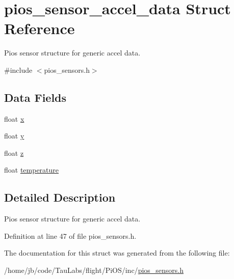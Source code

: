 \hypertarget{structpios__sensor__accel__data}{\section{pios\-\_\-sensor\-\_\-accel\-\_\-data \-Struct \-Reference}
\label{structpios__sensor__accel__data}
}


\-Pios sensor structure for generic accel data.  




{\ttfamily \#include $<$pios\-\_\-sensors.\-h$>$}

\subsection*{\-Data \-Fields}
\begin{DoxyCompactItemize}
\item 
float \hyperlink{group___p_i_o_s___s_e_n_s_o_r_s_gae32485cbb3023e21caf5ac1fd8378fb3}{x}
\item 
float \hyperlink{group___p_i_o_s___s_e_n_s_o_r_s_ga9f94596a8b62bafbbbd58e9196347e82}{y}
\item 
float \hyperlink{group___p_i_o_s___s_e_n_s_o_r_s_ga8d801598e8a0f5aade459361b3ec9b7a}{z}
\item 
float \hyperlink{group___p_i_o_s___s_e_n_s_o_r_s_gadb57b0d1050bd04870c0ad76832f4287}{temperature}
\end{DoxyCompactItemize}


\subsection{\-Detailed \-Description}
\-Pios sensor structure for generic accel data. 

\-Definition at line 47 of file pios\-\_\-sensors.\-h.



\-The documentation for this struct was generated from the following file\-:\begin{DoxyCompactItemize}
\item 
/home/jb/code/\-Tau\-Labs/flight/\-Pi\-O\-S/inc/\hyperlink{pios__sensors_8h}{pios\-\_\-sensors.\-h}\end{DoxyCompactItemize}
